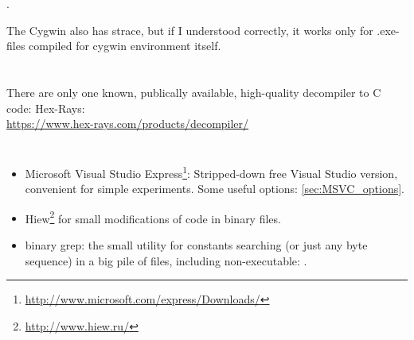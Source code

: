 \index{\MacOSX}
.

{The Cygwin also has strace, but if I understood correctly, it works only for .exe-files
compiled for cygwin environment itself}.

\chapter{}

{There are only one known, publically available, high-quality decompiler to C code}: Hex-Rays:\\
\url{https://www.hex-rays.com/products/decompiler/}


\chapter{}

\begin{itemize}
\item
Microsoft Visual Studio Express\footnote{\url{http://www.microsoft.com/express/Downloads/}}:
{Stripped-down free Visual Studio version, convenient for simple experiments}.
Some useful options: \ref{sec:MSVC_options}.

\item
\label{Hiew}
Hiew\footnote{\url{http://www.hiew.ru/}} 
{for small modifications of code in binary files}.

\item
{}
binary grep: 
{the small utility for constants searching (or just any byte sequence) in a big pile of files, 
including non-executable: \BGREPURL.}
\end{itemize}

